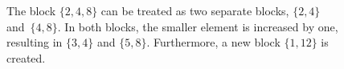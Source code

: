 \documentclass[11pt]{amsart}
\newcounter{width}
\DeclareMathOperator{\row}{Row}
\theoremstyle{definition}
\begin{document}
\begin{figure}[ht]
\begin{center}
\end{center}
\caption{The block $\{2, 4, 8\}$ can be treated as two separate blocks, $\{2, 4\}$ and~$\{4, 8\}$. In both blocks, the smaller element is increased by one, resulting in $\{3, 4\}$ and $\{5, 8\}$. Furthermore, a new block $\{1, 12\}$ is created.}
\label{fig:s_ncp_row2}
\end{figure}
\end{document}
